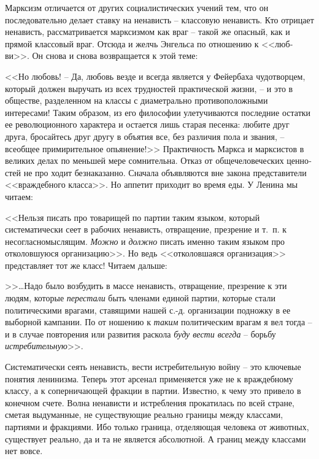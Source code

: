 \documentclass{book}
\begin{document}
Марксизм отличается от других социалистических учений тем, что он последовательно делает ставку на ненависть -- клас­совую 
ненависть. Кто отрицает ненависть, рассматривается марксизмом как враг -- такой же опасный, как и прямой классовый враг. Отсюда 
и желчь Энгельса по отношению к <<люб­ви>>. Он снова и снова возвращается к этой теме:

<<Но любовь! -- Да, любовь везде и всегда является у Фейер­баха чудотворцем, который должен выручать из всех трудно­стей 
практической жизни, -- и это в обществе, разделенном на классы с диаметрально противоположными интересами! Та­ким образом, из его 
философии улетучиваются последние остат­ки ее революционного характера и остается лишь старая песен­ка: любите друг друга, 
бросайтесь друг другу в объятия все, без различия пола и звания, -- всеобщее примирительное опьянение!>>%
Практичность Маркса и марксистов в великих делах по меньшей мере сомнительна. Отказ от общечеловеческих ценно­стей не про ходит 
безнаказанно. Сначала объявляются вне закона представители <<враждебного класса>>. Но аппетит приходит во время еды. У Ленина мы 
читаем:

<<Нельзя писать про товарищей по партии таким языком, ко­торый систематически сеет в рабочих ненависть, отвращение, презрение и т.~п. к несогласномыслящим. \textit{Можно} и \textit{должно}  пи­сать именно таким языком про отколовшуюся организацию>>.
Но ведь <<отколовшаяся организация>> представляет тот же класс! Читаем дальше:

>>\ldots Надо было возбудить в массе ненависть, отвращение, презрение к эти людям, которые \textit{перестали}  быть членами 
единой партии, которые стали политическими врагами, ставящими на­шей с.-д. организации подножку в ее выборной кампании. По от­
ношению к \textit{таким}  политическим врагам я вел тогда -- и в случае повторения или развития раскола \textit{буду вести 
всегда} --  борьбу \textit{истребительную}>>.%

Систематически сеять ненависть, вести истребительную вой­ну -- это ключевые понятия ленинизма. Теперь этот арсенал при­меняется 
уже не к враждебному классу, а к соперничающей фракции в партии. Известно, к чему это привело в конечном счете. Волна ненависти 
и истребления прокатилась по всей стра­не, сметая выдуманные, не существующие реально границы между классами, партиями и 
фракциями. Ибо только граница, отделяющая человека от животных, существует реально, да и та не является абсолютной. А границ 
между классами нет вовсе.
\end{document}
